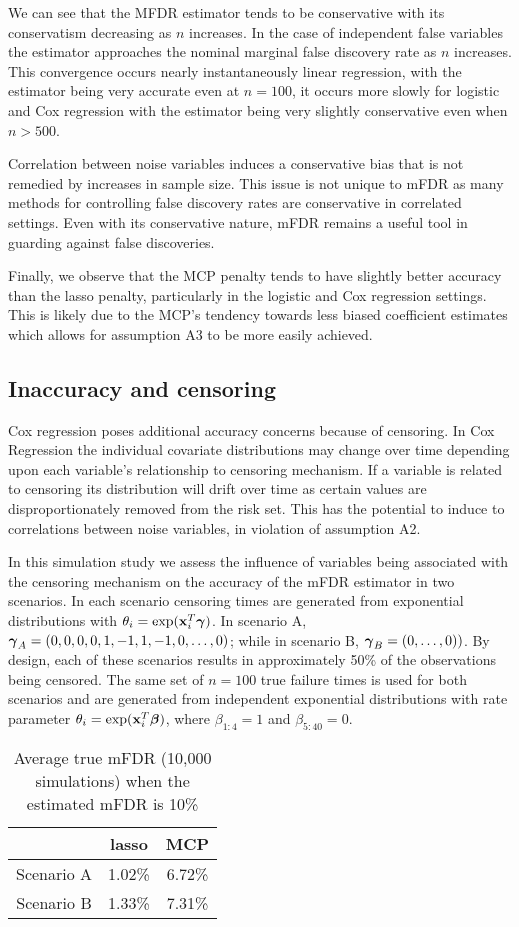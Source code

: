 We can see that the MFDR estimator tends to be conservative with its conservatism decreasing as $n$ increases.  In the case of independent false variables the estimator approaches the nominal marginal false discovery rate as $n$ increases.  This convergence occurs nearly instantaneously linear regression, with the estimator being very accurate even at $n=100$, it occurs more slowly for logistic and Cox regression with the estimator being very slightly conservative even when $n > 500$.

Correlation between noise variables induces a conservative bias that is not remedied by increases in sample size.  This issue is not unique to mFDR as many methods for controlling false discovery rates are conservative in correlated settings.  Even with its conservative nature, mFDR remains a useful tool in guarding against false discoveries.  

Finally, we observe that the MCP penalty tends to have slightly better accuracy than the lasso penalty, particularly in the logistic and Cox regression settings.  This is likely due to the MCP's tendency towards less biased coefficient estimates which allows for assumption A3 to be more easily achieved.

\subsection{Inaccuracy and censoring}

Cox regression poses additional accuracy concerns because of censoring. In Cox Regression the individual covariate distributions may change over time depending upon each variable's relationship to censoring mechanism.  If a variable is related to censoring its distribution will drift over time as certain values are disproportionately removed from the risk set. This has the potential to induce to correlations between noise variables, in violation of assumption A2.

In this simulation study we assess the influence of variables being associated with the censoring mechanism on the accuracy of the mFDR estimator in two scenarios.  In each scenario censoring times are generated from exponential distributions with $\theta_{i} = \exp(\mathbf{x}_i^T \boldsymbol{\gamma})$. In scenario A, $\boldsymbol{\gamma}_A = (0, 0, 0, 0, 1, -1, 1, -1, 0, \ldots, 0) $; while in scenario B, $\boldsymbol{\gamma}_B = (0, \ldots, 0) )$.  By design, each of these scenarios results in approximately 50\% of the observations being censored.  The same set of $n = 100$ true failure times is used for both scenarios and are generated from independent exponential distributions with rate parameter $\theta_i = \exp(\mathbf{x}_i^T \boldsymbol{\beta})$, where $\beta_{1:4} = 1$ and $\beta_{5:40} = 0$.
\begin{table}[!htb]
 \caption{Average true mFDR (10,000 simulations) when the estimated mFDR is 10\%}
\centering
\begin{tabular}{c c c}
  \hline
 & lasso & MCP   \\  [0.5ex]
  \hline \hline 
  Scenario A & 1.02\% & 6.72\% \\ 
  Scenario B &  1.33\% & 7.31\% \\ 
   \hline
\end{tabular}
\end{table}

